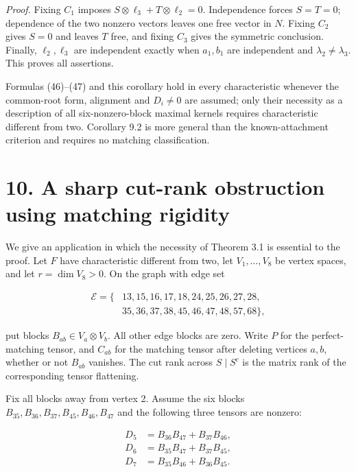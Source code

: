 \documentclass[11pt]{article}
\begin{document}
\nopagebreak[4]

\emph{Proof.} Fixing $C_1$ imposes $S\otimes\ell_3+T\otimes\ell_2=0$. Independence forces $S=T=0$; dependence of the two nonzero vectors leaves one free vector in $N$. Fixing $C_2$ gives $S=0$ and leaves $T$ free, and fixing $C_3$ gives the symmetric conclusion. Finally, $\ell_2,\ell_3$ are independent exactly when $a_1,b_1$ are independent and $\lambda_2\ne\lambda_3$. This proves all assertions.


Formulas (46)--(47) and this corollary hold in every characteristic whenever the common-root form, alignment and $D_i\ne0$ are assumed; only their necessity as a description of all six-nonzero-block maximal kernels requires characteristic different from two. Corollary 9.2 is more general than the known-attachment criterion and requires no matching classification.


\section*{10. A sharp cut-rank obstruction using matching rigidity}

We give an application in which the necessity of Theorem 3.1 is essential to the proof. Let $F$ have characteristic different from two, let $V_1,\ldots,V_8$ be vertex spaces, and let $r=\dim V_8>0$. On the graph with edge set


\nopagebreak[4]

\begin{equation}
\begin{aligned}
\mathcal E=\{&13,15,16,17,18,24,25,26,27,28,\\
&35,36,37,38,45,46,47,48,57,68\},
\end{aligned}
\tag{48}
\end{equation}

put blocks $B_{ab}\in V_a\otimes V_b$. All other edge blocks are zero. Write $P$ for the perfect-matching tensor, and $C_{ab}$ for the matching tensor after deleting vertices $a,b$, whether or not $B_{ab}$ vanishes. The cut rank across $S\mid S^c$ is the matrix rank of the corresponding tensor flattening.


Fix all blocks away from vertex 2. Assume the six blocks $B_{35},B_{36},B_{37},B_{45},B_{46},B_{47}$ and the following three tensors are nonzero:


\nopagebreak[4]

\begin{equation}
\begin{aligned}
D_5&=B_{36}B_{47}+B_{37}B_{46},\\
D_6&=B_{35}B_{47}+B_{37}B_{45},\\
D_7&=B_{35}B_{46}+B_{36}B_{45}.
\end{aligned}
\tag{49}
\end{equation}
\end{document}
